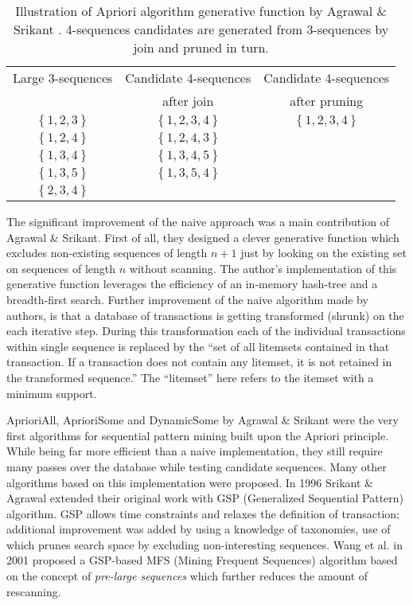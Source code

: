 \begin{table}
\begin{center}
    \begin{tabular}{ | c | c | c |}
    \hline
    Large 3-sequences & Candidate 4-sequences                     & Candidate 4-sequences \\ 
                      & after join                                & after pruning \\ 
    \hline
    $\left\{ 1, 2, 3 \right\} $ & $ \left\{ 1, 2, 3, 4 \right\} $ & $ \left\{ 1, 2, 3, 4 \right\} $ \\ 
    \hline
    $\left\{ 1, 2, 4 \right\} $ & $ \left\{ 1, 2, 4, 3 \right\} $ & \\ 
    \hline
    $\left\{ 1, 3, 4 \right\} $ & $ \left\{ 1, 3, 4, 5 \right\} $ & \\ 
    \hline
    $\left\{ 1, 3, 5 \right\} $ & $ \left\{ 1, 3, 5, 4 \right\} $ & \\ 
    \hline
    $\left\{ 2, 3, 4 \right\} $  &                                & \\ 
    \hline
    \end{tabular}
    \caption{Illustration of Apriori algorithm generative function by Agrawal \& Srikant \cite{citeulike:775528}. 4-sequences candidates are generated from 3-sequences by join and pruned in turn.}
    \label{fig:apriori}
    \end{center}
\end{table}

The significant improvement of the naive approach was a main contribution of Agrawal \& Srikant. First of all, they designed a clever generative function which excludes non-existing sequences of length $n+1$ just by looking on the existing set on sequences of length $n$ without scanning. The author's implementation of this generative function leverages the efficiency of an in-memory hash-tree and a breadth-first search. Further improvement of the naive algorithm made by authors, is that a database of transactions is getting transformed (shrunk) on the each iterative step. During this transformation each of the individual transactions within single sequence is replaced by the ``set of all litemsets contained in that transaction. If a transaction does not contain any litemset, it is not retained in the transformed sequence.'' The ``litemset'' here refers to the itemset with a minimum support.

AprioriAll, AprioriSome and DynamicSome by Agrawal \& Srikant were the very first algorithms for sequential pattern mining built upon the Apriori principle. While being far more efficient than a naive implementation, they still require many passes over the database while testing candidate sequences. Many other algorithms based on this implementation were proposed. In 1996 Srikant \& Agrawal extended their original work with GSP (Generalized Sequential Pattern) algorithm. GSP allows time constraints and relaxes the definition of transaction; additional improvement was added by using a knowledge of taxonomies, use of which prunes search space by excluding non-interesting sequences. Wang et al. in 2001 proposed a GSP-based MFS (Mining Frequent Sequences) \cite{citeulike:5164952} algorithm based on the concept of \textit{pre-large sequences} which further reduces the amount of rescanning.